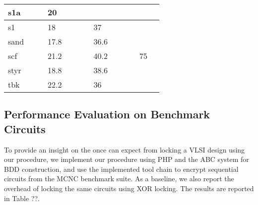 \begin{table*}[ht]
\begin{tabular}{|l|l|l|l|l|l|l|l|l|l|l|l|l|}
s1a             &           &           & 20         &          &           &           &          &      &           &           &          &          \\ \hline
s1             &           &           & 18          &          &           &           &         37 &         &           &           &          &          \\ \hline
sand             &           &           & 17.8         &          &           &           &        36.6  &         &           &           &          &          \\ \hline
scf             &           &           & 21.2         &          &           &           &         40.2 &         &           &           &         75 &          \\ \hline
styr             &           &           & 18.8         &          &           &           &         38.6 &         &           &           &          &          \\ \hline
tbk             &           &           & 22.2         &          &           &           &         36 &         &          &           &          &          \\ \hline

\end{tabular}
\end{table*}





\subsection{Performance Evaluation on Benchmark Circuits}
To provide an insight on the once can expect from locking a VLSI design using our procedure, we implement our procedure using PHP and the ABC system \cite{} for BDD construction, and use the implemented tool chain to encrypt sequential circuits from the MCNC benchmark suite. As a baseline, we also report the overhead of locking the same circuits using XOR locking. The results are reported in Table ??.

